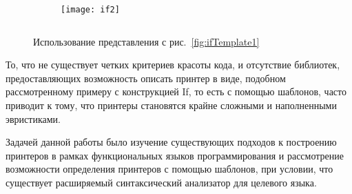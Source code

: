 \begin{figure}[h!]
	\begin{subfigure}[b]{0.65\linewidth}
		\centering
		\texttt{[image: if2]}
		\caption{}
		\label{fig:ifImage2}
	\end{subfigure}
	\hspace{0.5cm}
	\begin{subfigure}[b]{0.25\linewidth}
		\centering
		\inputminted{haskell}{codes/ifCode2.hs}
		\caption{}
		\label{fig:ifCode2}
	\end{subfigure}

	\caption{Использование представления с рис.~\ref{fig:ifTemplate1}}
\end{figure}

То, что не существует четких критериев красоты кода, и отсутствие библиотек, предоставляющих возможность описать принтер в виде, подобном
рассмотренному примеру с конструкцией If, то есть с помощью шаблонов, часто приводит к тому, что принтеры становятся крайне сложными и наполненными эвристиками.

Задачей данной работы было изучение существующих подходов к построению принтеров в рамках функциональных языков программирования и рассмотрение возможности определения принтеров с помощью шаблонов, при условии, что существует расширяемый синтаксический анализатор для целевого языка.